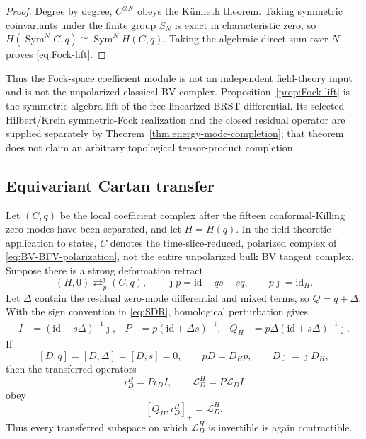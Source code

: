 \documentclass[11pt]{article}
\theoremstyle{definition}
\theoremstyle{remark}
\newcommand{\cL}{\mathcal L}
\newcommand{\id}{\mathrm{id}}
\begin{document}
\begin{proof}
Degree by degree, $C^{\otimes N}$ obeys the K\"unneth theorem.  Taking
symmetric coinvariants under the finite group $S_N$ is exact in
characteristic zero, so
$H(\operatorname{Sym}^NC,q)\cong\operatorname{Sym}^NH(C,q)$.  Taking the
algebraic direct sum over $N$ proves \eqref{eq:Fock-lift}.
\end{proof}

Thus the Fock-space coefficient module is not an independent field-theory
input and is not the unpolarized classical BV complex.
Proposition~\ref{prop:Fock-lift} is the symmetric-algebra lift of the free
linearized BRST differential.  Its selected
Hilbert/Krein symmetric-Fock realization and the closed residual operator
are supplied separately by Theorem~\ref{thm:energy-mode-completion}; that
theorem does not claim an arbitrary topological tensor-product completion.

\subsection{Equivariant Cartan transfer}

Let $(C,q)$ be the local coefficient complex after the fifteen
conformal-Killing zero modes have been separated, and let $H=H(q)$.  In the
field-theoretic application to states, $C$ denotes the time-slice-reduced,
polarized complex of \eqref{eq:BV-BFV-polarization}, not the entire
unpolarized bulk BV tangent complex.  Suppose
there is a strong deformation retract
\begin{equation}\label{eq:SDR}
 (H,0)\mathrel{\mathop{\rightleftarrows}^{\jmath}_{p}}(C,q),
 \qquad
 \jmath p=\id-qs-sq,
 \qquad p\jmath=\id_H.
\end{equation}
Let $\Delta$ contain the residual zero-mode differential and mixed terms, so
$Q=q+\Delta$.  With the sign convention in \eqref{eq:SDR}, homological
perturbation gives
\begin{align}\label{eq:HPL-data}
 I&=(\id+s\Delta)^{-1}\jmath,
 &P&=p(\id+\Delta s)^{-1},
 &Q_H&=p\Delta(\id+s\Delta)^{-1}\jmath.
\end{align}
If
\begin{equation}\label{eq:D-equivariance}
 [D,q]=[D,\Delta]=[D,s]=0,
 \qquad pD=D_Hp,
 \qquad D\jmath=\jmath D_H,
\end{equation}
then the transferred operators
\begin{equation}
 \iota_D^H=P\iota_DI,
 \qquad \cL_D^H=P\cL_DI
\end{equation}
obey
\begin{equation}\label{eq:transferred-Cartan}
 [Q_H,\iota_D^H]_+=\cL_D^H.
\end{equation}
Thus every transferred subspace on which $\cL_D^H$ is invertible is again
contractible.
\end{document}
